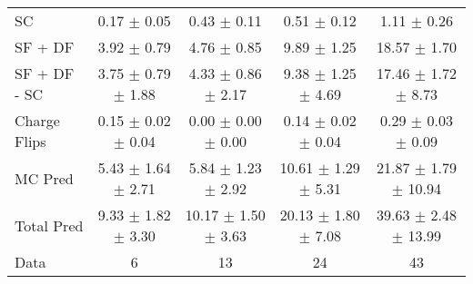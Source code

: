 \begin{tabular}{l|cccc}
                                 SC &  0.17 $\pm$  0.05 &  0.43 $\pm$  0.11 &  0.51 $\pm$  0.12 &  1.11 $\pm$  0.26 \\
                            SF + DF &  3.92 $\pm$  0.79 &  4.76 $\pm$  0.85 &  9.89 $\pm$  1.25 & 18.57 $\pm$  1.70 \\
\hline
                       SF + DF - SC &  3.75 $\pm$  0.79 $\pm$  1.88 &  4.33 $\pm$  0.86 $\pm$  2.17 &  9.38 $\pm$  1.25 $\pm$  4.69 & 17.46 $\pm$  1.72 $\pm$  8.73 \\
\hline\hline
                       Charge Flips &  0.15 $\pm$  0.02 $\pm$  0.04 &  0.00 $\pm$  0.00 $\pm$  0.00 &  0.14 $\pm$  0.02 $\pm$  0.04 &  0.29 $\pm$  0.03 $\pm$  0.09 \\
\hline
                            MC Pred &  5.43 $\pm$  1.64 $\pm$  2.71 &  5.84 $\pm$  1.23 $\pm$  2.92 & 10.61 $\pm$  1.29 $\pm$  5.31 & 21.87 $\pm$  1.79 $\pm$ 10.94 \\
\hline
                         Total Pred &  9.33 $\pm$  1.82 $\pm$  3.30 & 10.17 $\pm$  1.50 $\pm$  3.63 & 20.13 $\pm$  1.80 $\pm$  7.08 & 39.63 $\pm$  2.48 $\pm$ 13.99 \\
\hline\hline
                               Data &     6 &    13 &    24 &    43 \\
\hline\hline
\end{tabular}

